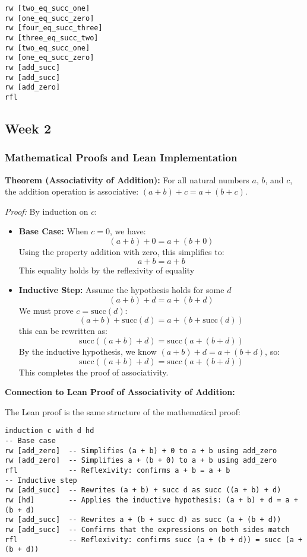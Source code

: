 \documentclass{article}
\theoremstyle{theorem}
\theoremstyle{definition}
\theoremstyle{remark}
\begin{document}
\begin{verbatim}
rw [two_eq_succ_one]
rw [one_eq_succ_zero]
rw [four_eq_succ_three]
rw [three_eq_succ_two]
rw [two_eq_succ_one]
rw [one_eq_succ_zero]
rw [add_succ]
rw [add_succ]
rw [add_zero]
rfl
\end{verbatim}

\subsection{Week 2}

\subsubsection*{Mathematical Proofs and Lean Implementation}

\textbf{Theorem (Associativity of Addition):} For all natural numbers $a$, $b$, and $c$, the addition operation is associative: $(a + b) + c = a + (b + c)$.

\textit{Proof:} By induction on $c$:

\begin{itemize}
    \item \textbf{Base Case:} When $c = 0$, we have:
    \[
    (a + b) + 0 = a + (b + 0)
    \]
    Using the property addition with zero, this simplifies to:
    \[
    a + b = a + b
    \]
    This equality holds by the reflexivity of equality

    \item \textbf{Inductive Step:} Assume the hypothesis holds for some $d$
    \[
    (a + b) + d = a + (b + d)
    \]
    We must prove $c = \text{succ}(d)$:
    \[
    (a + b) + \text{succ}(d) = a + (b + \text{succ}(d))
    \]
    this can be rewritten as:
    \[
    \text{succ}((a + b) + d) = \text{succ}(a + (b + d))
    \]
    By the inductive hypothesis, we know $(a + b) + d = a + (b + d)$, so:
    \[
    \text{succ}((a + b) + d) = \text{succ}(a + (b + d))
    \]
    This completes the proof of associativity.
\end{itemize}

\textbf{Connection to Lean Proof of Associativity of Addition:}

The Lean proof is the same structure of the mathematical proof:

\begin{verbatim}
induction c with d hd
-- Base case
rw [add_zero]  -- Simplifies (a + b) + 0 to a + b using add_zero
rw [add_zero]  -- Simplifies a + (b + 0) to a + b using add_zero
rfl            -- Reflexivity: confirms a + b = a + b
-- Inductive step
rw [add_succ]  -- Rewrites (a + b) + succ d as succ ((a + b) + d)
rw [hd]        -- Applies the inductive hypothesis: (a + b) + d = a + (b + d)
rw [add_succ]  -- Rewrites a + (b + succ d) as succ (a + (b + d))
rw [add_succ]  -- Confirms that the expressions on both sides match
rfl            -- Reflexivity: confirms succ (a + (b + d)) = succ (a + (b + d))
\end{verbatim}
\end{document}
